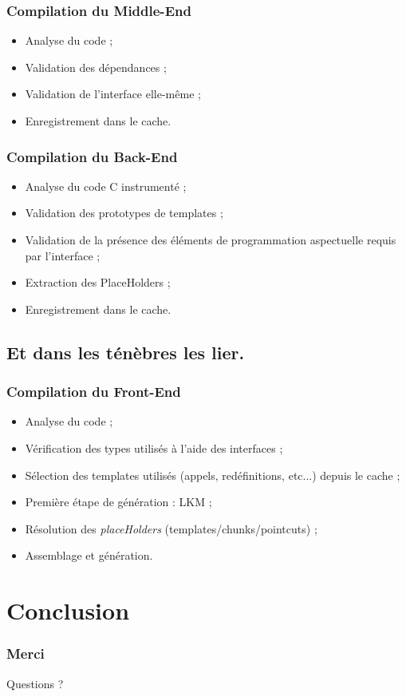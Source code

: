 \documentclass[]{beamer}
\begin{document}
\begin{frame}
\frametitle{Compilation du Middle-End}
\begin{itemize}[<+->]
    \item Analyse du code ;
    \item Validation des dépendances ;
    \item Validation de l'interface elle-même ;
    \item Enregistrement dans le cache.
\end{itemize}
\end{frame}

\begin{frame}
\frametitle{Compilation du Back-End}
\begin{itemize}[<+->]
    \item Analyse du code C instrumenté ;
    \item Validation des prototypes de templates ;
    \item Validation de la présence des éléments de programmation aspectuelle
            requis par l'interface ;
    \item Extraction des PlaceHolders ;
    \item Enregistrement dans le cache.
\end{itemize}
\end{frame}

\subsection{Et dans les ténèbres les lier.}
\begin{frame}
\frametitle{Compilation du Front-End}
\begin{itemize}[<+->]
    \item Analyse du code ;
    \item Vérification des types utilisés à l'aide des interfaces ;
    \item Sélection des templates utilisés (appels, redéfinitions, etc...) depuis le cache ;
    \item Première étape de génération : LKM ;
    \item Résolution des \emph{placeHolders} (templates/chunks/pointcuts) ;
    \item Assemblage et génération.
\end{itemize}
\end{frame}

\section{Conclusion}
\begin{frame}
\frametitle{Merci}
Questions ?
\end{frame}
\end{document}
